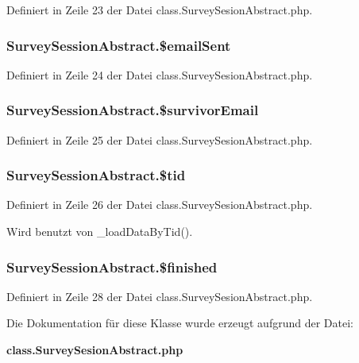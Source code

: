 Definiert in Zeile 23 der Datei class.SurveySesionAbstract.php.
\subsubsection{\setlength{\rightskip}{0pt plus 5cm}SurveySessionAbstract.\$emailSent}\label{classSurveySessionAbstract_983a0db471e88ce01eadb58e21c81122}




Definiert in Zeile 24 der Datei class.SurveySesionAbstract.php.
\subsubsection{\setlength{\rightskip}{0pt plus 5cm}SurveySessionAbstract.\$survivorEmail}\label{classSurveySessionAbstract_f745e304367b7a402b51429df24405fe}




Definiert in Zeile 25 der Datei class.SurveySesionAbstract.php.
\subsubsection{\setlength{\rightskip}{0pt plus 5cm}SurveySessionAbstract.\$tid}\label{classSurveySessionAbstract_1b101512633550e5a7f22943fd49f520}




Definiert in Zeile 26 der Datei class.SurveySesionAbstract.php.

Wird benutzt von \_\-loadDataByTid().
\subsubsection{\setlength{\rightskip}{0pt plus 5cm}SurveySessionAbstract.\$finished}\label{classSurveySessionAbstract_44c20f3ff4d239ee0c0991f73769b0df}




Definiert in Zeile 28 der Datei class.SurveySesionAbstract.php.

Die Dokumentation für diese Klasse wurde erzeugt aufgrund der Datei:\begin{CompactItemize}
\item 
{\bf class.SurveySesionAbstract.php}\end{CompactItemize}
